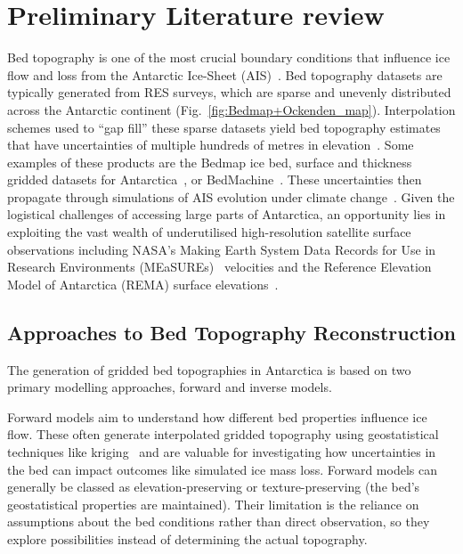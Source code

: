 \chapter{Preliminary Literature review}\label{review}

Bed topography is one of the most crucial boundary conditions that influence ice flow and loss from the Antarctic Ice-Sheet (AIS)~\cite{Morlighem_2020}. Bed topography datasets are typically generated from RES surveys, which are sparse and unevenly distributed across the Antarctic continent (Fig.~\ref{fig:Bedmap+Ockenden_map}). Interpolation schemes used to ``gap fill'' these sparse datasets yield bed topography estimates that have uncertainties of multiple hundreds of metres in elevation~\cite{Morlighem_2020, Pritchard_2025, Ockenden_2026}. Some examples of these products are the Bedmap ice bed, surface and thickness gridded datasets for Antarctica~\cite{Lythe_2001, Fretwell_2013, Pritchard_2025}, or BedMachine~\cite{Morlighem_2017, Morlighem_2026}. These uncertainties then propagate through simulations of AIS evolution under climate change~\cite{Castleman_2022}. Given the logistical challenges of accessing large parts of Antarctica, an opportunity lies in exploiting the vast wealth of underutilised high-resolution satellite surface observations including NASA's Making Earth System Data Records for Use in Research Environments (MEaSUREs)~\cite{Rignot_2017} velocities and the Reference Elevation Model of Antarctica (REMA) surface elevations~\cite{REMA}. 

\section{Approaches to Bed Topography Reconstruction}\label{topography_reconstruction}

The generation of gridded bed topographies in Antarctica is based on two primary modelling approaches, forward and inverse models.

Forward models aim to understand how different bed properties influence ice flow. These often generate interpolated gridded topography using geostatistical techniques like kriging~\cite{Mackie_2020} and are valuable for investigating how uncertainties in the bed can impact outcomes like simulated ice mass loss. Forward models can generally be classed as elevation-preserving or texture-preserving (the bed's geostatistical properties are maintained). Their limitation is the reliance on assumptions about the bed conditions rather than direct observation, so they explore possibilities instead of determining the actual topography.

